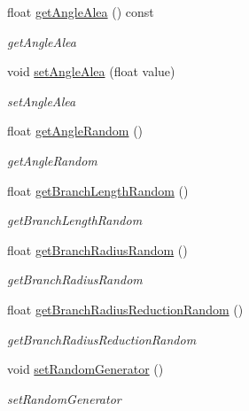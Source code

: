 \begin{DoxyCompactItemize}
float \hyperlink{classLSystem_aa6cc5c18686831374eafcfda3c96d392}{get\+Angle\+Alea} () const
\begin{DoxyCompactList}\small\item\em get\+Angle\+Alea \end{DoxyCompactList}\item 
void \hyperlink{classLSystem_ad05d5d24fdbe1ac6496bf5d9733a4702}{set\+Angle\+Alea} (float value)
\begin{DoxyCompactList}\small\item\em set\+Angle\+Alea \end{DoxyCompactList}\item 
float \hyperlink{classLSystem_a2f5928d5bbfc537395e5c5f134f2b1e3}{get\+Angle\+Random} ()
\begin{DoxyCompactList}\small\item\em get\+Angle\+Random \end{DoxyCompactList}\item 
float \hyperlink{classLSystem_a826543c6871f8cc26b0be7ad7c4c3f22}{get\+Branch\+Length\+Random} ()
\begin{DoxyCompactList}\small\item\em get\+Branch\+Length\+Random \end{DoxyCompactList}\item 
float \hyperlink{classLSystem_aceef49d8f1e28428711c43f7d0487fed}{get\+Branch\+Radius\+Random} ()
\begin{DoxyCompactList}\small\item\em get\+Branch\+Radius\+Random \end{DoxyCompactList}\item 
float \hyperlink{classLSystem_a868ccee91400bb3636befe0bdeab79d3}{get\+Branch\+Radius\+Reduction\+Random} ()
\begin{DoxyCompactList}\small\item\em get\+Branch\+Radius\+Reduction\+Random \end{DoxyCompactList}\item 
void \hyperlink{classLSystem_a91a77e99c7a237c8504dfa5dd01f9570}{set\+Random\+Generator} ()
\begin{DoxyCompactList}\small\item\em set\+Random\+Generator \end{DoxyCompactList}\end{DoxyCompactItemize}
